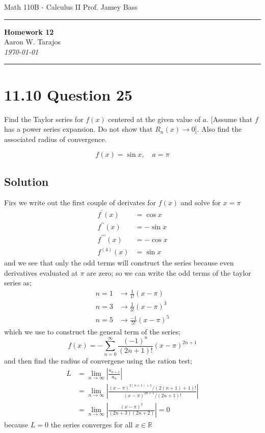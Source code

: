 \documentclass{article}
\begin{document}
\noindent
Math 110B - Calculus II  \hfill Prof. Jamey Bass

\noindent\rule{\textwidth}{0.4pt}

\begin{center}
    \textbf{\LARGE Homework 12} \\
    \vspace{12pt}
    \large Aaron W. Tarajos \\
    \textit{\today}
\end{center}

\noindent\rule{\textwidth}{0.4pt}

\section*{11.10 Question 25}
 Find the Taylor series for $f(x)$ centered at the given value
of $a$. [Assume that $f$ has a power series expansion. Do not show
that $R_n(x)\to 0$]. Also find the associated radius of convergence.

\[
	f(x) = \sin x, \quad a = \pi
\]

\subsection*{Solution}
Firs we write out the first couple of derivates for $f(x)$ and solve for $x = \pi$
\begin{align*}
	f^\prime(x) &= \cos x \\
	f^{\prime\prime}(x) &= -\sin x \\
	f^{\prime\prime\prime}(x) &= -\cos x \\
	f^{(4)}(x) &= \sin x
\end{align*}
and we see that only the odd terms will construct the series because even derivatives evaluated at $\pi$ are zero; so we can write the odd terms of the taylor series as;
\begin{align*}
	n = 1 &\rightarrow \frac{1}{1!}(x-\pi) \\
	n=3 &\rightarrow \frac{1}{3!}(x-\pi)^3 \\
	n=5 &\rightarrow \frac{-1}{5!}(x-\pi)^5
\end{align*}
which we use to construct the general term of the series;
\begin{equation}
	f(x) = -\sum_{n=0}^\infty \frac{(-1)^n}{(2n+1)!}(x-\pi)^{2n+1}
\end{equation}
and then find the radius of convergene using the ration test;
\begin{align*}
	L &= \lim_{n \to \infty} \left| \frac{a_{n+1}}{a_n} \right| \\
	  &= \lim_{n \to \infty} \left| \frac{(x - \pi)^{2(n+1)+1}/(2(n+1)+1)!}{(x - \pi)^{2n+1}/(2n+1)!} \right| \\
	  &= \lim_{n \to \infty} \left| \frac{(x - \pi)^2}{(2n+3)(2n+2)} \right| = 0
\end{align*}
because $L=0$ the series converges for all $x \in \mathbb{R}$
\end{document}
